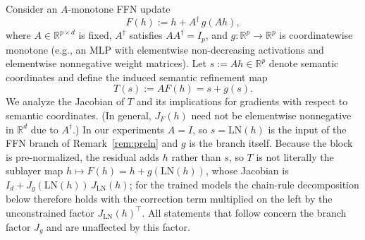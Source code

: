 \documentclass{article}
\theoremstyle{plain}
\theoremstyle{definition}
\theoremstyle{remark}
\begin{document}
Consider an $A$-monotone FFN update
\[
F(h) := h + A^\dagger\, g(Ah),
\]
where $A\in\mathbb{R}^{p\times d}$ is fixed, $A^\dagger$ satisfies $AA^\dagger=I_p$,
and $g:\mathbb{R}^p\to\mathbb{R}^p$ is coordinatewise monotone (e.g., an MLP with
elementwise non-decreasing activations and elementwise nonnegative weight matrices).
Let $s := Ah \in \mathbb{R}^p$ denote semantic coordinates and define the induced
semantic refinement map
\[
T(s) := A F(h) = s + g(s).
\]
We analyze the Jacobian of $T$ and its implications for gradients with respect to
semantic coordinates. (In general, $J_F(h)$ need not be elementwise nonnegative in
$\mathbb{R}^d$ due to $A^\dagger$.)
In our experiments $A = I$, so $s = \mathrm{LN}(h)$ is the input of the FFN branch of
Remark~\ref{rem:preln} and $g$ is the branch itself. Because the block is
pre-normalized, the residual adds $h$ rather than $s$, so $T$ is not literally the
sublayer map $h \mapsto F(h) = h + g(\mathrm{LN}(h))$, whose Jacobian is
$I_d + J_g(\mathrm{LN}(h))\,J_{\mathrm{LN}}(h)$; for the trained models the chain-rule
decomposition below therefore holds with the correction term multiplied on the left by
the unconstrained factor $J_{\mathrm{LN}}(h)^{\top}$. All statements that follow concern
the branch factor $J_g$ and are unaffected by this factor.




\end{document}
